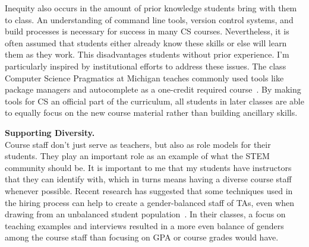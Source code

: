 \documentclass[11pt]{article} %
\begin{document}
Inequity also occurs in the amount of prior knowledge students bring with them
to class.
%
An understanding of command line tools, version control systems, and build
processes is necessary for success in many CS courses. Nevertheless, it is
often assumed that students either already know these skills or else will learn
them as they work. This disadvantages students without prior experience.
%
%
I'm particularly inspired by institutional efforts to address these issues. The
class Computer Science Pragmatics at Michigan teaches commonly used tools like
package managers and autocomplete as a one-credit required
course~\footnotemark{}.
%
By making tools for CS an official part of the curriculum, all students in
later classes are able to equally focus on the new course material rather than
building ancillary skills.


\bigskip
\textbf{\textsf{\large Supporting Diversity.}}\\
Course staff don't just serve as teachers, but also as role models for their
students. They play an important role as an example of what the STEM community
should be.
%
It is important to me that my students have instructors that they can identify
with, which in turns means having a diverse course staff whenever possible.
%
Recent research has suggested that some techniques used in the hiring process
can help to create a gender-balanced staff of TAs, even when drawing from an
unbalanced student population~\footnotemark{}. In their classes, a focus on
teaching examples and interviews resulted in a more even balance of genders
among the course staff than focusing on GPA or course grades would have.

\end{document}
